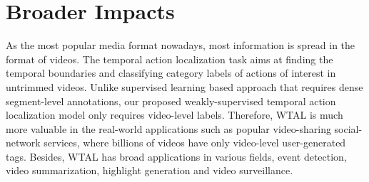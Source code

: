\section{Broader Impacts}
\label{sec:impact}
As the most popular media format nowadays, most information is spread in the format of videos. 
The temporal action localization task aims at finding the temporal boundaries and classifying category labels of actions of interest in untrimmed videos. 
Unlike supervised learning based approach that requires dense segment-level annotations, our proposed weakly-supervised temporal action localization model \system only requires video-level labels. 
Therefore, WTAL is much more valuable in the real-world applications such as popular video-sharing social-network services, where billions of videos have only video-level user-generated tags.
Besides, WTAL has broad applications in various fields, \eg event detection, video summarization, highlight generation and video surveillance.

